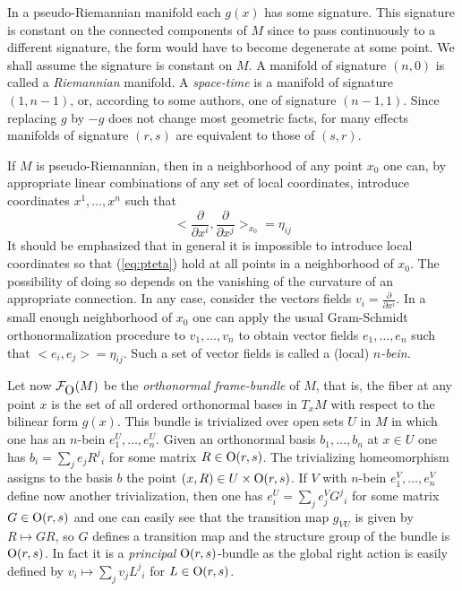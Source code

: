 \documentclass[12pt,titlepage]{article}
\def\cF{{\cal F}}
\def\O{\hbox{O}}
\def\ppv#1#2{\frac{\partial}{\partial #1^#2}}
\begin{document}
In a pseudo-Riemannian manifold each \(g(x)\) has some signature. This
signature is constant on the connected components of \(M\) since to pass
continuously to
a different signature, the form would have to become degenerate at some
point. We shall assume the signature is constant on \(M\). A manifold of
signature \((n,0)\) is called a {\em Riemannian\/}
%
 manifold. A
{\em space-time\/}
%
 is a manifold of signature \((1, n-1)\), or, according
to some authors, one of signature \((n-1,1)\). Since replacing 
\(g\) by \(-g\) does not change most geometric facts, for many effects  
manifolds of signature \((r,s)\) are equivalent to
those of \((s,r)\).

If \(M\) is pseudo-Riemannian, then in a neighborhood of any point \(x_0\)
one
can, by appropriate linear combinations of any set of local coordinates, 
introduce  coordinates \(x^1,\dots,x^n\) such that
\begin{equation}\label{eq:pteta}%
<\ppv{x}{i}, \ppv{x}{j}>_{x_0}=\eta_{ij}
\end{equation}%
It should be emphasized that in general it is impossible to introduce
local coordinates so that (\ref{eq:pteta}) hold at all points in a
neighborhood of \(x_0\). The possibility of doing so depends on the
vanishing of the curvature of an appropriate connection.
In any case, consider the vectors fields \(v_i = \ppv{x}{i}\).
 In a small enough neighborhood of \(x_0\) one can apply the
usual Gram-Schmidt orthonormalization procedure to \(v_1,\dots,v_n\)
to obtain vector
fields \(e_1,\dots,e_n\) such that \(<e_i,e_j> = \eta_{ij}\). Such a
set of vector fields is called a (local) 
%
{\em \(n\)-bein\/}.

Let now \(\cF_{\O}(M)\)
\index{\(F_O(M)\)@\(\cF_{\O}(M)\)}%
be the {\em orthonormal frame-bundle\/}
%
 of \(M\),
that is, the fiber at any point \(x\) is the set of all ordered
orthonormal bases
in \(T_xM\) with respect to the bilinear form \(g(x)\). This bundle is
trivialized over open sets \(U\) in \(M\) in which one has an
\(n\)-bein \(e^U_1,\dots,e^U_n\). Given an orthonormal basis
\(b_1,\dots,b_n\) at \(x\in U\) one has \(b_i = \sum_j e_j R^j{}_i\) for
some matrix \(R\in \O(r,s)\). The trivializing homeomorphism assigns
to the basis \(b\) the point \((x,R) \in U \times \O(r,s)\). If \(V\)
with \(n\)-bein \(e^V_1,\dots,e^V_n\) define now another trivialization,
then one has \(e^U_i = \sum_je^V_j G^j{}_i\) for some matrix \(G \in
\O(r,s)\)
and one can easily see that the transition map \(g_{VU}\) is given by
\(R \mapsto GR\), so \(G\) defines a transition map and the structure group
of the bundle is \(\O(r,s)\). In fact it is a {\em principal\/}
\(\O(r,s)\)-bundle as the global right action is easily defined by \(v_i
\mapsto \sum_j v_j L^j{}_i\) for \(L\in \O(r,s)\).
\end{document}
